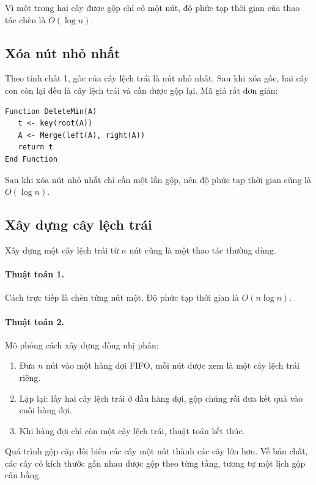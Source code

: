 \documentclass[11pt]{article}
\begin{document}
Vì một trong hai cây được gộp chỉ có một nút, độ phức tạp thời gian của thao
tác chèn là \(O(\log n)\).

\subsection{Xóa nút nhỏ nhất}

Theo tính chất 1, gốc của cây lệch trái là nút nhỏ nhất. Sau khi xóa gốc, hai
cây con còn lại đều là cây lệch trái và cần được gộp lại. Mã giả rất đơn giản:

\begin{verbatim}
Function DeleteMin(A)
   t <- key(root(A))
   A <- Merge(left(A), right(A))
   return t
End Function
\end{verbatim}

Sau khi xóa nút nhỏ nhất chỉ cần một lần gộp, nên độ phức tạp thời gian cũng là
\(O(\log n)\).

\subsection{Xây dựng cây lệch trái}

Xây dựng một cây lệch trái từ \(n\) nút cũng là một thao tác thường dùng.

\paragraph{Thuật toán 1.}
Cách trực tiếp là chèn từng nút một. Độ phức tạp thời gian là \(O(n\log n)\).

\paragraph{Thuật toán 2.}
Mô phỏng cách xây dựng đống nhị phân:

\begin{enumerate}
  \item Đưa \(n\) nút vào một hàng đợi FIFO, mỗi nút được xem là một cây lệch
  trái riêng.
  \item Lặp lại: lấy hai cây lệch trái ở đầu hàng đợi, gộp chúng rồi đưa kết
  quả vào cuối hàng đợi.
  \item Khi hàng đợi chỉ còn một cây lệch trái, thuật toán kết thúc.
\end{enumerate}

Quá trình gộp cặp đôi biến các cây một nút thành các cây lớn hơn. Về bản chất,
các cây có kích thước gần nhau được gộp theo từng
tầng, tương tự một lịch gộp cân bằng.
\end{document}
